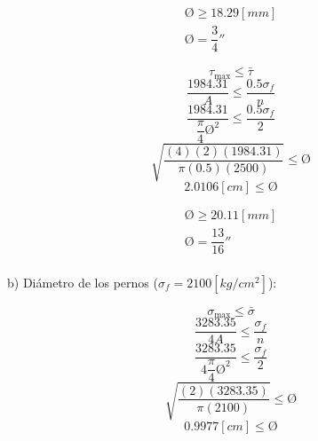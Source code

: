 \documentclass[letter,10pt,twoside]{article}
\begin{document}
\begin{equation*}
\boxed{
    \begin{array}{l}
        \text{\O} \ge 18.29[mm] \\
        \text{\O} = \dfrac{3}{4}''
    \end{array}
}
\end{equation*}

\begin{equation*}
    \tau_{\text{max}} \le \bar{\tau}
\end{equation*}
\begin{equation*}
    \frac{1984.31}{A} \le \frac{0.5 \sigma_f}{n}
\end{equation*}
\begin{equation*}
    \frac{1984.31}{\dfrac{\pi}{4} \text{\O}^2} \le \frac{0.5 \sigma_f}{2}
\end{equation*}
\begin{equation*}
    \sqrt{\frac{(4)(2)(1984.31)}{\pi(0.5)(2500)}} \le \text{\O}
\end{equation*}
\begin{equation*}
    2.0106[cm] \le \text{\O}
\end{equation*}

\begin{equation*}
\boxed{
    \boxed{
        \begin{array}{l}
            \text{\O} \ge 20.11[mm] \\
            \text{\O} = \dfrac{13}{16}''
        \end{array}
    }
}
\end{equation*}
\\

b) Diámetro de los pernos ($\sigma_f = 2100[kg/cm^2]$):

\begin{equation*}
    \sigma_{\text{max}} \le \bar{\sigma}
\end{equation*}
\begin{equation*}
    \frac{3283.35}{4A} \le \frac{\sigma_f}{n}
\end{equation*}
\begin{equation*}
    \frac{3283.35}{4\dfrac{\pi}{4} \text{\O}^2} \le \frac{\sigma_f}{2}
\end{equation*}
\begin{equation*}
    \sqrt{\frac{(2)(3283.35)}{\pi(2100)}} \le \text{\O}
\end{equation*}
\begin{equation*}
    0.9977[cm] \le \text{\O}
\end{equation*}
\end{document}
